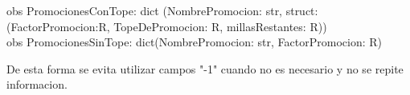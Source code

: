 \documentclass[11pt,a4paper]{article}
\begin{document}
\begin{enumerate}
\begin{enumerate}
		obs PromocionesConTope: dict (NombrePromocion: str, struct: (FactorPromocion:R, TopeDePromocion: R, millasRestantes: R)) \\

		obs PromocionesSinTope: dict(NombrePromocion: str, FactorPromocion: R)

		De esta forma se evita utilizar campos "-1" cuando no es necesario y no se repite informacion.
	\end{enumerate}
	

\end{enumerate}
\end{document}

